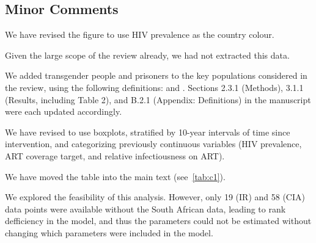 \subsection{Minor Comments}
\begin{comment}
Figure 2: I would prefer HIV prevalence over PLHIV as the chloropleth.
\end{comment}
\begin{response}
We have revised the figure to use HIV prevalence as the country colour.
\end{response}
\begin{comment}
Do any studies address the age distribution of key populations? This would be useful to include.
\end{comment}
\begin{response}
Given the large scope of the review already, we had not extracted this data.
\end{response}
\begin{comment}
Were transgender people or prisoners included in any studies?
\end{comment}
\begin{response}
We added transgender people and prisoners to the key populations considered in the review,
using the following definitions:
 and
.
Sections 2.3.1 (Methods), 3.1.1 (Results, including Table 2), and B.2.1 (Appendix: Definitions)
in the manuscript were each updated accordingly.
\end{response}
\begin{comment}
I find the bubble plots difficult to interpret. The bubbles are often similarly sized, I'm not sure the extra information adds to the results and crowds the plot. Perhaps grouped bar charts or grouped box plots would be easier to read - particularly for Figure 3.
\end{comment}
\begin{response}
We have revised to use boxplots,
stratified by 10-year intervals of time since intervention,
and categorizing previously continuous variables
(HIV prevalence, ART coverage target, and relative infectiousness on ART).
\end{response}
\begin{comment}
Consider inserting Table C.1 into the main text
\end{comment}
\begin{response}
We have moved the table into the main text (see~\ref{tab:c1}).
\end{response}
\begin{comment}
Consider a sensitivity analysis of the main findings without South African data
\end{comment}
\begin{response}
We explored the feasibility of this analysis.
However, only 19 (IR) and 58 (CIA) data points were available without the South African data,
leading to rank defficiency in the model,
and thus the parameters could not be estimated
without changing which parameters were included in the model.
\end{response}
